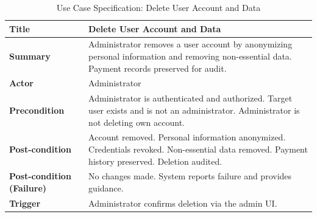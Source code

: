 \begin{table}[H]
    \centering
    \caption{Use Case Specification: Delete User Account and Data}
    \begin{tabular}{|p{2.7cm}|p{12.5cm}|}
        \hline
        \textbf{Title}          & Delete User Account and Data \\\hline
        
        \textbf{Summary}        & Administrator removes a user account by anonymizing personal information and removing non-essential data. Payment records preserved for audit. \\\hline
        
        \textbf{Actor}          & Administrator \\\hline
        
        \textbf{Precondition}   & Administrator is authenticated and authorized. Target user exists and is not an administrator. Administrator is not deleting own account. \\\hline
        
        \textbf{Post-condition} & Account removed. Personal information anonymized. Credentials revoked. Non-essential data removed. Payment history preserved. Deletion audited. \\\hline
        
        \textbf{Post-condition (Failure)} & No changes made. System reports failure and provides guidance. \\\hline
        
        \textbf{Trigger}        & Administrator confirms deletion via the admin UI. \\\hline
        

\end{tabular}
\end{table}
